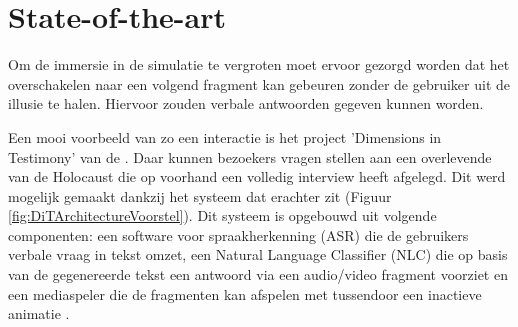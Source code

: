 %
%
%
%
%


\section{State-of-the-art}%
\label{sec:state-of-the-art}

Om de immersie in de simulatie te vergroten moet ervoor gezorgd worden dat het overschakelen naar een volgend fragment kan gebeuren zonder de gebruiker uit de illusie te halen. Hiervoor zouden verbale antwoorden gegeven kunnen worden.

Een mooi voorbeeld van zo een interactie is het project 'Dimensions in Testimony' van de \textcite{USCShoahFoundation2020}. Daar kunnen bezoekers vragen stellen aan een overlevende van de Holocaust die op voorhand een volledig interview heeft afgelegd. Dit werd mogelijk gemaakt dankzij het systeem dat erachter zit (Figuur \ref{fig:DiTArchitectureVoorstel}). Dit systeem is opgebouwd uit volgende componenten: een software voor spraakherkenning (ASR) die de gebruikers verbale vraag in tekst omzet, een Natural Language Classifier (NLC) die op basis van de gegenereerde tekst een antwoord via een audio/video fragment voorziet en een mediaspeler die de fragmenten kan afspelen met tussendoor een inactieve animatie \autocite{Traum2015}.

